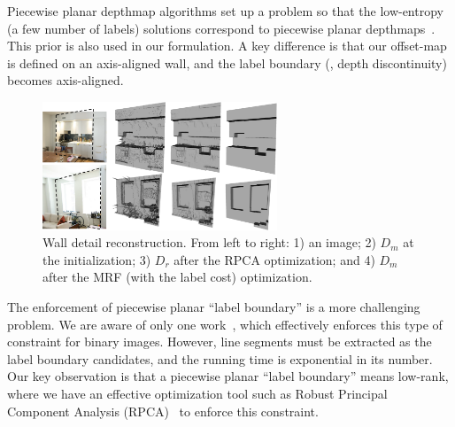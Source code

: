 Piecewise planar depthmap algorithms set up a problem so that the
low-entropy (a few number of labels) solutions correspond to piecewise
planar depthmaps~\cite{ManhattanWorldStereo,SinhaPlane09,GallupPlanar10}.
This prior is also used in our formulation. A key difference is that our
offset-map is defined on an axis-aligned wall, and the label boundary
(\ie, depth discontinuity) becomes axis-aligned.
%
\begin{figure}[!t]
\begin{center}
\includegraphics[width=70mm]{../figures/comp_details.pdf} 
\end{center}
\caption{Wall detail reconstruction. From left to right: 1) an image; 2)
 $D_m$ at the initialization; 3) $D_r$ after the RPCA optimization; and
 4) $D_m$ after the MRF (with the label cost) optimization.
 } \label{fig:comp_details}
 \vspace{-0.325cm}
\end{figure}
%
The enforcement of piecewise planar ``label boundary'' is a more
challenging problem. We are aware of only one
work~\cite{silberman2014contour}, which effectively enforces this type
of constraint for binary images. However, line segments must be
extracted as the label boundary candidates, and the running time is
exponential in its number.
Our key observation is that a piecewise planar ``label boundary'' means
low-rank, where we have an effective optimization tool such as Robust
Principal Component Analysis (RPCA)~\cite{Candes2011} to enforce this
constraint.  

